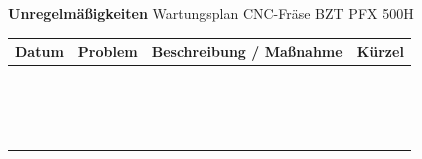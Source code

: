 \documentclass[a4paper,landscape,10pt]{scrartcl}
\begin{document}
\newpage
{\Large\bfseries Unregelmäßigkeiten} \hfill \small Wartungsplan CNC-Fräse BZT PFX 500H\\[2mm]
\normalsize
\setlength{\tabcolsep}{4pt}
\renewcommand{\arraystretch}{1}
\begin{tabularx}{\linewidth}{|p{22mm}|p{80mm}|X|p{20mm}|}
  \hline
  \textbf{Datum} & \textbf{Problem} & \textbf{Beschreibung / Maßnahme} & \textbf{Kürzel} \\
  \hline
  & & & \rule[-3mm]{0pt}{10.5mm}\\ \hline
  & & & \rule[-3mm]{0pt}{10.5mm}\\ \hline
  & & & \rule[-3mm]{0pt}{10.5mm}\\ \hline
  & & & \rule[-3mm]{0pt}{10.5mm}\\ \hline
  & & & \rule[-3mm]{0pt}{10.5mm}\\ \hline
  & & & \rule[-3mm]{0pt}{10.5mm}\\ \hline
  & & & \rule[-3mm]{0pt}{10.5mm}\\ \hline
  & & & \rule[-3mm]{0pt}{10.5mm}\\ \hline
  & & & \rule[-3mm]{0pt}{10.5mm}\\ \hline
  & & & \rule[-3mm]{0pt}{10.5mm}\\ \hline
  & & & \rule[-3mm]{0pt}{10.5mm}\\ \hline
  & & & \rule[-3mm]{0pt}{10.5mm}\\ \hline
  & & & \rule[-3mm]{0pt}{10.5mm}\\ \hline
  & & & \rule[-3mm]{0pt}{10.5mm}\\ \hline
  & & & \rule[-3mm]{0pt}{10.5mm}\\ \hline
  & & & \rule[-3mm]{0pt}{10.5mm}\\ \hline
\end{tabularx}
\end{document}
